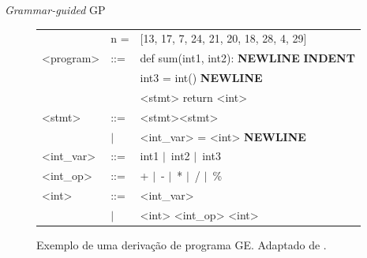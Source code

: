
\providecommand{\tok}[1]{\mbox{\textsf{\textbf{#1}}}}
\providecommand{\ou}{$\mid$\ }

\begin{frame}{\textit{Grammar-guided} GP}
  \begin{figure}
  \centering
  \begin{examples}
  \small
  \ttfamily
  \setlength{\tabcolsep}{4pt}
  \renewcommand{\arraystretch}{1.35}
  \begin{tabular}{@{}l l l@{}}
    &n = &[13, 17, 7, 24, 21, 20, 18, 28, 4, 29] \\
    <program>  & ::= & def sum(int1, int2): \tok{NEWLINE} \tok{INDENT} \\
               &     & int3 = int() \tok{NEWLINE} \\
               &     & <stmt> return <int> \\
    <stmt>     & ::= & <stmt><stmt> \\
               & \ou & <int\_var> = <int> \tok{NEWLINE} \\
    <int\_var> & ::= & int1 \ou int2 \ou int3 \\
    <int\_op>  & ::= & + \ou - \ou * \ou / \ou \% \\
    <int>      & ::= & <int\_var> \\
               & \ou & <int> <int\_op> <int> \\
  \end{tabular}
  \end{examples}
  \caption{Exemplo de uma derivação de programa GE. Adaptado de \cite{survey}.}
  \end{figure}
\end{frame}
